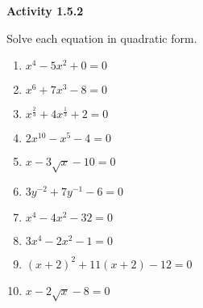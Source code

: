 \noindent\textbf{Activity 1.5.2}

\vspace{0.75ex}

Solve each equation in quadratic form. 

\begin{multicols}{2}
\begin{enumerate}[label = \color{blue}\arabic*. ]
   \item $ x^{4} - 5x^{2} + 0 = 0 $
   \item $ x^{6} + 7x^{3} - 8 = 0 $
   \item $ x^{\tfrac{2}{3}} + 4x^{\tfrac{1}{3}} + 2 = 0 $
   \item $ 2x^{10} - x^{5} - 4 = 0 $
   \item $ x - 3\sqrt{x} - 10 = 0 $
   \item $ 3y^{-2} + 7y^{-1} - 6 = 0 $
   \item $ x^{4} - 4x^{2} - 32 = 0 $
   \item $ 3x^{4} - 2x^{2} - 1 = 0 $
   \item $ (x+2)^{2} + 11(x+2) - 12 = 0 $
   \item $ x - 2\sqrt{x} - 8 = 0 $
\end{enumerate}
\end{multicols} 



